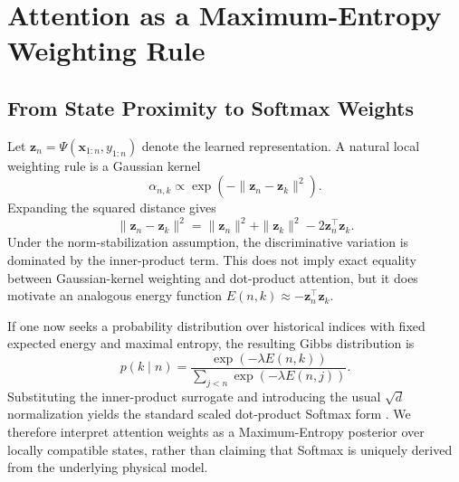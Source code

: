 \documentclass[conference]{IEEEtran}
\begin{document}
\section{Attention as a Maximum-Entropy Weighting Rule}
\label{sec:attention_theory}

\subsection{From State Proximity to Softmax Weights}
Let $\mathbf{z}_n=\Psi(\mathbf{x}_{1:n},y_{1:n})$ denote the learned representation. A natural local weighting rule is a Gaussian kernel
\begin{equation}
\alpha_{n,k} \propto \exp\left(-\|\mathbf{z}_n-\mathbf{z}_k\|^2\right).
\end{equation}
Expanding the squared distance gives
\begin{equation}
\|\mathbf{z}_n-\mathbf{z}_k\|^2
= \|\mathbf{z}_n\|^2 + \|\mathbf{z}_k\|^2 - 2\mathbf{z}_n^\top \mathbf{z}_k.
\end{equation}
Under the norm-stabilization assumption, the discriminative variation is dominated by the inner-product term. This does not imply exact equality between Gaussian-kernel weighting and dot-product attention, but it does motivate an analogous energy function $E(n,k) \approx -\mathbf{z}_n^\top \mathbf{z}_k$.

If one now seeks a probability distribution over historical indices with fixed expected energy and maximal entropy, the resulting Gibbs distribution is \cite{jaynes1957information}
\begin{equation}
p(k \mid n) = \frac{\exp(-\lambda E(n,k))}{\sum_{j<n}\exp(-\lambda E(n,j))}.
\end{equation}
Substituting the inner-product surrogate and introducing the usual $\sqrt{d}$ normalization yields the standard scaled dot-product Softmax form \cite{vaswani2017attention}. We therefore interpret attention weights as a Maximum-Entropy posterior over locally compatible states, rather than claiming that Softmax is uniquely derived from the underlying physical model.
\end{document}
